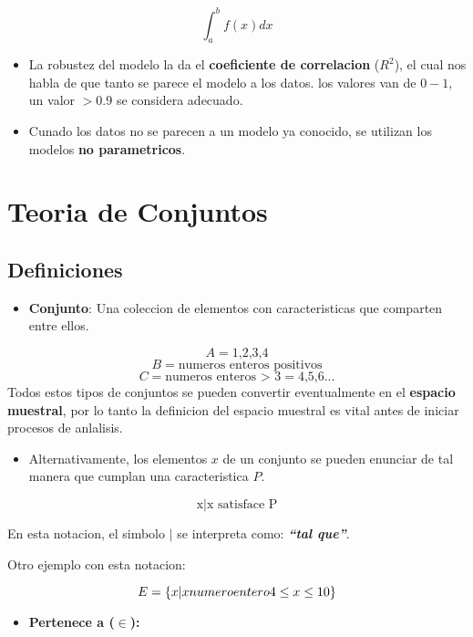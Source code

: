 \documentclass[]{book}
\providecommand{\tightlist}{%
  \setlength{\itemsep}{0pt}\setlength{\parskip}{0pt}}
\begin{document}
\[\int_{a}^{b} f(x)dx\]

\begin{itemize}
\tightlist
\item
  La robustez del modelo la da el \textbf{coeficiente de correlacion}
  (\(R^2\)), el cual nos habla de que tanto se parece el modelo a los
  datos. los valores van de \(0-1\), un valor \(>0.9\) se considera
  adecuado.
\item
  Cunado los datos no se parecen a un modelo ya conocido, se utilizan
  los modelos \textbf{no parametricos}.
\end{itemize}

\section{Teoria de Conjuntos}\label{teoria-de-conjuntos-1}

\subsection{Definiciones}\label{definiciones-1}

\begin{itemize}
\tightlist
\item
  \textbf{Conjunto}: Una coleccion de elementos con caracteristicas que
  comparten entre ellos.
\end{itemize}

\[A=\text{{1,2,3,4}}\] \[B = \text{{numeros enteros positivos}}\]
\[ C = \text{{numeros enteros > 3}} = \text{{4,5,6...}}\] Todos estos
tipos de conjuntos se pueden convertir eventualmente en el
\textbf{espacio muestral}, por lo tanto la definicion del espacio
muestral es vital antes de iniciar procesos de anlalisis.

\begin{itemize}
\tightlist
\item
  Alternativamente, los elementos \(x\) de un conjunto se pueden
  enunciar de tal manera que cumplan una caracteristica \(P\).
\end{itemize}

\[\text{{x|x satisface P}}\]

En esta notacion, el simbolo \emph{\(|\)} se interpreta como:
\textbf{\emph{``tal que''}}.

Otro ejemplo con esta notacion:

\[ E = \{x|x \space numero\space entero\space 4 \leq x \leq 10\}\]

\begin{itemize}
\tightlist
\item
  \textbf{Pertenece a (\(\in\)):}
\end{itemize}
\end{document}
